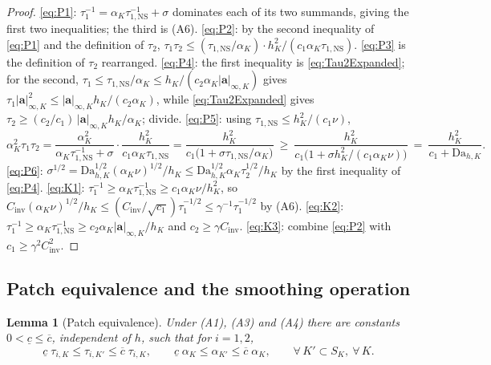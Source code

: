 \documentclass[11pt]{article}
\newtheorem{lemma}[theorem]{Lemma}
\theoremstyle{remark}
\newcommand{\ba}{\boldsymbol{a}}
\newcommand{\tns}{\tau_{1,\mathrm{NS}}}
\newcommand{\Dah}{\mathrm{Da}_{h,K}}
\begin{document}
\begin{proof}
\cref{eq:P1}: $\tau_1^{-1} = \alpha_K\tns^{-1} + \sigma$ dominates each of its two
summands, giving the first two inequalities; the third is (A6). \cref{eq:P2}: by the
second inequality of \cref{eq:P1} and the definition of $\tau_2$,
$\tau_1\tau_2 \le (\tns/\alpha_K)\cdot h_K^2/(c_1\alpha_K\tns)$. \cref{eq:P3} is the
definition of $\tau_2$ rearranged. \cref{eq:P4}: the first inequality is
\cref{eq:Tau2Expanded}; for the second, $\tau_1 \le \tns/\alpha_K \le
h_K/(c_2\alpha_K|\ba|_{\infty,K})$ gives
$\tau_1|\ba|_{\infty,K}^2 \le |\ba|_{\infty,K}h_K/(c_2\alpha_K)$, while
\cref{eq:Tau2Expanded} gives
$\tau_2 \ge (c_2/c_1)\,|\ba|_{\infty,K}h_K/\alpha_K$; divide. \cref{eq:P5}: using
$\tns \le h_K^2/(c_1\nu)$,
\[
  \alpha_K^2\tau_1\tau_2
  = \frac{\alpha_K^2}{\alpha_K\tns^{-1}+\sigma}\cdot\frac{h_K^2}{c_1\alpha_K\tns}
  = \frac{h_K^2}{c_1\bigl(1 + \sigma\tns/\alpha_K\bigr)}
  \ \ge\ \frac{h_K^2}{c_1\bigl(1 + \sigma h_K^2/(c_1\alpha_K\nu)\bigr)}
  \ =\ \frac{h_K^2}{c_1 + \Dah}.
\]
\cref{eq:P6}: $\sigma^{1/2} = \Dah^{1/2}(\alpha_K\nu)^{1/2}/h_K \le
\Dah^{1/2}\alpha_K\tau_2^{1/2}/h_K$ by the first inequality of \cref{eq:P4}.
\cref{eq:K1}: $\tau_1^{-1} \ge \alpha_K\tns^{-1} \ge c_1\alpha_K\nu/h_K^2$, so
$C_{\mathrm{inv}}(\alpha_K\nu)^{1/2}/h_K \le
(C_{\mathrm{inv}}/\sqrt{c_1})\tau_1^{-1/2} \le \gamma^{-1}\tau_1^{-1/2}$ by (A6).
\cref{eq:K2}: $\tau_1^{-1} \ge \alpha_K\tns^{-1} \ge c_2\alpha_K|\ba|_{\infty,K}/h_K$
and $c_2 \ge \gamma C_{\mathrm{inv}}$. \cref{eq:K3}: combine \cref{eq:P2} with
$c_1 \ge \gamma^2C_{\mathrm{inv}}^2$.
\end{proof}

\subsection{Patch equivalence and the smoothing operation}

\begin{lemma}[Patch equivalence]
\label{lem:patch}
Under \textup{(A1)}, \textup{(A3)} and \textup{(A4)} there are constants
$0 < \underline{c} \le \overline{c}$, independent of $h$, such that for $i = 1,2$,
\begin{equation}
  \label{eq:PatchEquivalence}
  \underline{c}\;\tau_{i,K} \le \tau_{i,K'} \le \overline{c}\;\tau_{i,K},
  \qquad
  \underline{c}\;\alpha_{K} \le \alpha_{K'} \le \overline{c}\;\alpha_{K},
  \qquad \forall\, K' \subset S_K,\ \forall\, K.
\end{equation}
\end{lemma}
\end{document}

